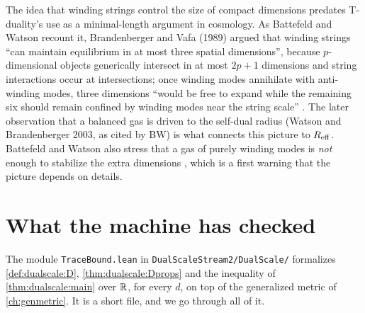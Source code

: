 \begin{historybox}
The idea that winding strings control the size of compact dimensions predates T-duality's use
as a minimal-length argument in cosmology. As Battefeld and Watson recount it, Brandenberger
and Vafa (1989) argued that winding strings ``can maintain equilibrium in at most three spatial
dimensions'', because $p$-dimensional objects generically intersect in at most $2p+1$
dimensions and string interactions occur at intersections; once winding modes annihilate with
anti-winding modes, three dimensions ``would be free to expand while the remaining six should
remain confined by winding modes near the string scale'' . The
later observation that a balanced gas is driven to the self-dual radius (Watson and
Brandenberger 2003, as cited by BW) is what connects this picture to $R_{\rm eff}$. Battefeld
and Watson also stress that a gas of purely winding modes is \emph{not} enough to stabilize
the extra dimensions , which is a first warning that the
picture depends on details.
\end{historybox}

\section{What the machine has checked}\label{sec:dualscale:lean}

The module \texttt{TraceBound.lean} in \texttt{DualScaleStream2/DualScale/} formalizes
\cref{def:dualscale:D}, \cref{thm:dualscale:Dprops} and the inequality of
\cref{thm:dualscale:main} over $\mathbb{R}$, for every $d$, on top of the generalized metric
 of \cref{ch:genmetric}. It is a short file, and we go through all of it.

